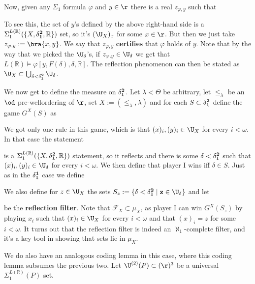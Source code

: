 \qquad Now, given any $\Sigma_1$ formula $\varphi$ and $y\in\r$ there is a real $z_{\varphi,y}$ such that

To see this, the set of $y$'s defined by the above right-hand side is a $\Sigma_1^{L(\mathbb R)}(\{X,\bf\delta^2_1,\mathbb R\})$ set, so it's $(\U_X)_x$ for some $x\in\r$. But then we just take $z_{\varphi,y}:=\bra{x,y}$. We say that $z_{\varphi,y}$ \textbf{certifies} that $\varphi$ holds of $y$. Note that by the way that we picked the $\U_\delta$'s, if $z_{\varphi,y}\in\U_\delta$ we get that $L(\mathbb R)\models\varphi[y,F(\delta),\delta,\mathbb R]$. The reflection phenomenon can then be stated as $\U_X\subset\bigcup_{\delta<\bf\delta^2_1}\U_\delta$.

\qquad We now get to define the measure on $\bf\delta^2_1$. Let $\lambda<\Theta$ be arbitrary, let $\leq_\lambda$ be an $\od$ pre-wellordering of $\r$, set $X:=(\leq_\lambda,\lambda)$ and for each $S\subset\bf\delta^2_1$ define the game $G^X(S)$ as

We got only one rule in this game, which is that $(x)_i,(y)_i\in\U_X$ for every $i<\omega$. In that case the statement

is a $\Sigma_1^{L(\mathbb R)}(\{X,\bf\delta^2_1,\mathbb R\})$ statement, so it reflects and there is some $\delta<\bf\delta^2_1$ such that $(x)_i,(y)_i\in\U_\delta$ for every $i<\omega$. We then define that player I wins iff $\delta\in S$. Just as in the $\bf\delta^1_1$ case we define

We also define for $z\in\U_X$ the sets $S_z:=\{\delta<\bf\delta^2_1\mid z\in\U_\delta\}$ and let

be the \textbf{reflection filter}. Note that $\mathcal F_X\subset\mu_X$, as player I can win $G^X(S_z)$ by playing $x_i$ such that $(x)_i\in\U_X$ for every $i<\omega$ and that $(x)_i=z$ for some $i<\omega$. It turns out that the reflection filter is indeed an $\aleph_1$-complete filter, and it's a key tool in showing that sets lie in $\mu_X$.

\qquad We do also have an analogous coding lemma in this case, where this coding lemma subsumes the previous two. Let $\U^{(2)}(P)\subset(\r)^3$ be a universal $\Sigma_1^{L(\mathbb R)}(P)$ set.

